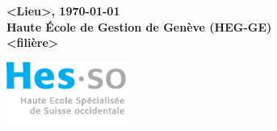 \begin{titlepage}
\begin{center}
			\vspace{2cm}
			\vfill		

			\textbf{\large <Lieu>, \today{}}\\
				\textbf{\large Haute École de Gestion de Genève (HEG-GE)}\\
				\textbf{\large <filière>}\\

		\end{center}

 		\vfill
		
			\begin{flushright}
		 		\includegraphics[width=4cm]{images/hes-logo.eps}
			\end{flushright}
  
	\end{titlepage}
\makeatother

\thispagestyle{empty}
\styleCenter		%
